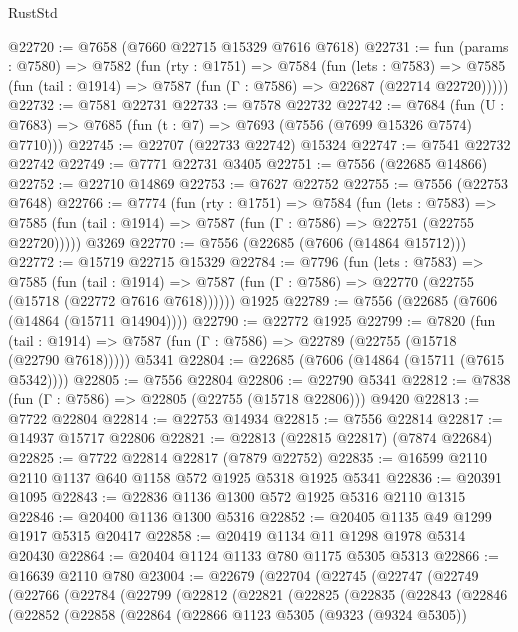 \begin{lexlean}{RustStd}
\begin{coremodule}
{\begin{coremodule}
{{{{{{{{{{{{{{{{{{{{{{{{{{{{{{{{{{{{{{{{{{{@22720 := @7658 (@7660 @22715 @15329 @7616 @7618)
@22731 := fun (params : @7580) =>
  @7582
    (fun (rty : @1751) =>
    @7584
      (fun (lets : @7583) =>
      @7585 (fun (tail : @1914) => @7587 (fun (Γ : @7586) => @22687 (@22714 @22720)))))
@22732 := @7581 @22731
@22733 := @7578 @22732
@22742 := @7684
    (fun (U : @7683) => @7685 (fun (t : @7) => @7693 (@7556 (@7699 @15326 @7574) @7710)))
@22745 := @22707 (@22733 @22742) @15324
@22747 := @7541 @22732 @22742
@22749 := @7771 @22731 @3405
@22751 := @7556 (@22685 @14866)
@22752 := @22710 @14869
@22753 := @7627 @22752
@22755 := @7556 (@22753 @7648)
@22766 := @7774
    (fun (rty : @1751) =>
    @7584
      (fun (lets : @7583) =>
      @7585 (fun (tail : @1914) => @7587 (fun (Γ : @7586) => @22751 (@22755 @22720)))))
    @3269
@22770 := @7556 (@22685 (@7606 (@14864 @15712)))
@22772 := @15719 @22715 @15329
@22784 := @7796
    (fun (lets : @7583) =>
    @7585
      (fun (tail : @1914) =>
      @7587 (fun (Γ : @7586) => @22770 (@22755 (@15718 (@22772 @7616 @7618))))))
    @1925
@22789 := @7556 (@22685 (@7606 (@14864 (@15711 @14904))))
@22790 := @22772 @1925
@22799 := @7820
    (fun (tail : @1914) => @7587 (fun (Γ : @7586) => @22789 (@22755 (@15718 (@22790 @7618)))))
    @5341
@22804 := @22685 (@7606 (@14864 (@15711 (@7615 @5342))))
@22805 := @7556 @22804
@22806 := @22790 @5341
@22812 := @7838 (fun (Γ : @7586) => @22805 (@22755 (@15718 @22806))) @9420
@22813 := @7722 @22804
@22814 := @22753 @14934
@22815 := @7556 @22814
@22817 := @14937 @15717 @22806
@22821 := @22813 (@22815 @22817) (@7874 @22684)
@22825 := @7722 @22814 @22817 (@7879 @22752)
@22835 := @16599 @2110 @2110 @1137 @640 @1158 @572 @1925 @5318 @1925 @5341
@22836 := @20391 @1095
@22843 := @22836 @1136 @1300 @572 @1925 @5316 @2110 @1315
@22846 := @20400 @1136 @1300 @5316
@22852 := @20405 @1135 @49 @1299 @1917 @5315 @20417
@22858 := @20419 @1134 @11 @1298 @1978 @5314 @20430
@22864 := @20404 @1124 @1133 @780 @1175 @5305 @5313
@22866 := @16639 @2110 @780
@23004 := @22679
    (@22704
      (@22745
        (@22747
          (@22749
            (@22766
              (@22784
                (@22799
                  (@22812
                    (@22821
                      (@22825
                        (@22835
                          (@22843
                            (@22846
                              (@22852
                                (@22858
                                  (@22864
                                    (@22866
                                      @1123
                                      @5305
                                      (@9323 (@9324 @5305))
}}}}}}}}}}}}}}}}}}}}}}}}}}}}}}}}}}}}}}}}}}}
\end{coremodule}}
\end{coremodule}
\end{lexlean}
